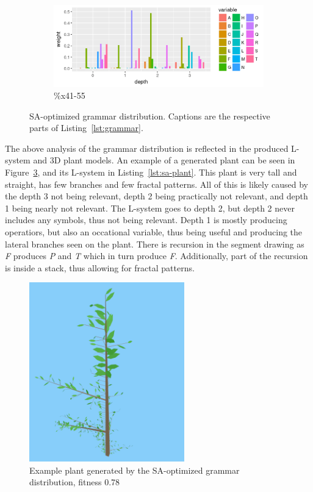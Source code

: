 \begin{figure}
    \ContinuedFloat
    \begin{subfigure}{0.98\textwidth}
        \includegraphics[width=\textwidth]{figures/sa-dist-var}
        \caption{\%x41-55}
        \label{fig:sa-dist-var}
    \end{subfigure}
    \caption[SA-optimized grammar distribution]{SA-optimized grammar distribution. Captions are the respective parts of Listing~\ref{lst:grammar}.}
    \label{fig:sa-dist}
\end{figure}

The above analysis of the grammar distribution is reflected in the produced L-system and 3D plant models.
An example of a generated plant can be seen in Figure~\ref{fig:sa-plant}, and its L-system in Listing~\ref{lst:sa-plant}.
This plant is very tall and straight, has few branches and few fractal patterns.
All of this is likely caused by the depth 3 not being relevant, depth 2 being practically not relevant, and depth 1 being nearly not relevant.
The L-system goes to depth 2, but depth 2 never includes any symbols, thus not being relevant.
Depth 1 is mostly producing operatiors, but also an occational variable, thus being useful and producing the lateral branches seen on the plant.
There is recursion in the segment drawing as \textit{F} produces \textit{P} and \textit{T} which in turn produce \textit{F}.
Additionally, part of the recursion is inside a stack, thus allowing for fractal patterns.

\begin{figure}
    \centering
    \includegraphics[width=0.6\textwidth]{figures/sa-plant}
    \caption[Example plant generated by the SA-optimized grammar distribution]{Example plant generated by the SA-optimized grammar distribution, fitness 0.78}
    \label{fig:sa-plant}
\end{figure}

